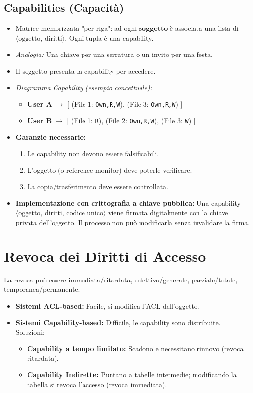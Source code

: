 \documentclass{article}
\begin{document}
\subsection{Capabilities (Capacità)}
\begin{itemize}
    \item Matrice memorizzata "per riga": ad ogni \textbf{soggetto} è associata una lista di $\langle \text{oggetto, diritti} \rangle$. Ogni tupla è una capability.
    \item \textit{Analogia:} Una chiave per una serratura o un invito per una festa.
    \item Il soggetto presenta la capability per accedere.
    \item \textit{Diagramma Capability (esempio concettuale):}
    \begin{itemize}
        \item \textbf{User A} $\rightarrow$ [ (File 1: \texttt{Own,R,W}), (File 3: \texttt{Own,R,W}) ]
        \item \textbf{User B} $\rightarrow$ [ (File 1: \texttt{R}), (File 2: \texttt{Own,R,W}), (File 3: \texttt{W}) ]
    \end{itemize}
    \item \textbf{Garanzie necessarie:}
    \begin{enumerate}
        \item Le capability non devono essere falsificabili.
        \item L'oggetto (o reference monitor) deve poterle verificare.
        \item La copia/trasferimento deve essere controllata.
    \end{enumerate}
    \item \textbf{Implementazione con crittografia a chiave pubblica:}
    Una capability $\langle \text{oggetto, diritti, codice\_unico} \rangle$ viene firmata digitalmente con la chiave privata dell'oggetto. Il processo non può modificarla senza invalidare la firma.
\end{itemize}

\section{Revoca dei Diritti di Accesso}
La revoca può essere immediata/ritardata, selettiva/generale, parziale/totale, temporanea/permanente.
\begin{itemize}
    \item \textbf{Sistemi ACL-based:} Facile, si modifica l'ACL dell'oggetto.
    \item \textbf{Sistemi Capability-based:} Difficile, le capability sono distribuite. Soluzioni:
    \begin{itemize}
        \item \textbf{Capability a tempo limitato:} Scadono e necessitano rinnovo (revoca ritardata).
        \item \textbf{Capability Indirette:} Puntano a tabelle intermedie; modificando la tabella si revoca l'accesso (revoca immediata).
    \end{itemize}
\end{itemize}
\end{document}
